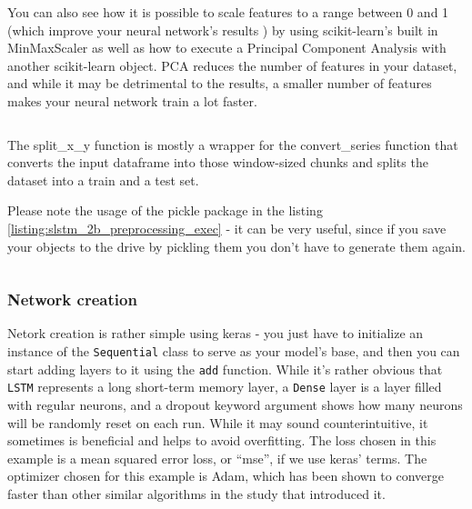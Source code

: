 \documentclass[12pt, a4paper]{article}
\begin{document}
You can also see how it is possible to scale features to a range between 0 and 1 (which improve your neural network's results \cite{muller2016introduction} \cite{grus2015data}) by using scikit-learn's\cite{pedregosa2011scikit} built in MinMaxScaler as well as how to execute a Principal Component Analysis\cite{wold1987principal} with another scikit-learn object. PCA reduces the number of features in your dataset, and while it may be detrimental to the results, a smaller number of features makes your neural network train a lot faster.

\bgroup
  \inputminted[linenos, breaklines=true, fontsize=\scriptsize, firstnumber=last]{python}{src/stocks/lstm/2a_preprocessing.py}
  \label{listing:slstm_2a_preprocessing}
\egroup

The split\_x\_y function is mostly a wrapper for the convert\_series function that converts the input dataframe into those window-sized chunks and splits the dataset into a train and a test set.

Please note the usage of the pickle package in the listing \ref{listing:slstm_2b_preprocessing_exec} - it can be very useful, since if you save your objects to the drive by pickling them you don't have to generate them again.

\bgroup
  \inputminted[linenos, breaklines=true, fontsize=\scriptsize, firstnumber=last]{python}{src/stocks/lstm/2b_preprocessing_exec.py}
  \label{listing:slstm_2b_preprocessing_exec}
\egroup

\subsubsection{Network creation}

Netork creation is rather simple using keras - you just have to initialize an instance of the \texttt{Sequential} class to serve as your model's base, and then you can start adding layers to it using the \texttt{add} function. While it's rather obvious that \texttt{LSTM} represents a long short-term memory layer, a \texttt{Dense} layer is a layer filled with regular neurons, and a dropout keyword argument shows how many neurons will be randomly reset on each run. While it may sound counterintuitive, it sometimes is beneficial and helps to avoid overfitting. The loss chosen in this example is a mean squared error loss, or ``mse'', if we use keras' terms. The optimizer chosen for this example is Adam, which has been shown to converge faster than other similar algorithms in the study that introduced it\cite{kingma2014adam}.
\end{document}
